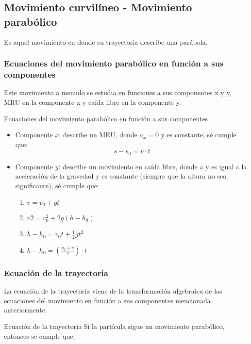 \subsection*{Movimiento curvilíneo - Movimiento parabólico}
Es aquel movimiento en donde su trayectoria describe una parábola.
\subsubsection*{Ecuaciones del movimiento parabólico en función a sus componentes}
Este movimiento a menudo se estudia en funciones a sus componentes x y y, MRU en la componente x y caída libre en la componente y.
\begin{Theorem*} {Ecuaciones del movimiento parabólico en función a sus componentes}
	\begin{itemize}
		\item Componente $x$: describe un MRU, donde $a_x=0$ y es constante, sé cumple que:
		$$ s-s_0=v\cdot t $$
		\item Componente $y$: describe un movimiento en caída libre, donde a y es igual a la aceleración de la gravedad y es constante (siempre que la altura no sea significante), sé cumple que:
		\begin{enumerate}
			\item $v=v_0+gt$
			\item $v2=v_0^2+2g(h-h_0)$
			\item $h-h_0=v_0t+\frac{1}{2}gt^2$
			\item $h-h_0=\left(\frac{v_0+v}{2}\right)\cdot t$
		\end{enumerate}
	\end{itemize}
\end{Theorem*}
\subsubsection*{Ecuación de la trayectoria}
La ecuación de la trayectoria viene de la transformación algebraica de las ecuaciones del movimiento en función a sus componentes mencionada anteriormente.
\begin{Theorem*} {Ecuación de la trayectoria}
	Si la partícula sigue un movimiento parabólico, entonces se cumple que:
\end{Theorem*}
